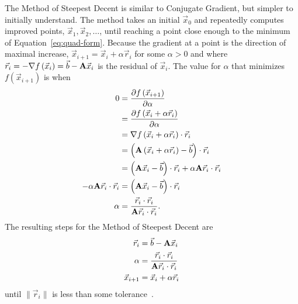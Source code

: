The Method of Steepest Decent is similar to Conjugate Gradient, but simpler to initially understand.
The method takes an initial \(\vec{x}_0\) and repeatedly computes improved points, \(\vec{x}_1, \vec{x}_2, \dots\), until reaching a point close enough to the minimum of Equation~\ref{eq:quad-form}.
Because the gradient at a point is the direction of maximal increase, \(\vec{x}_{i+1} = \vec{x}_i + \alpha \vec{r}_i\) for some \(\alpha > 0\) and where \(\vec{r}_i = -\nabla f\left(\vec{x}_i\right) = \vec{b} - \mathbf{A}\vec{x}_i\) is the residual of \(\vec{x}_i\).
The value for \(\alpha\) that minimizes \(f\left(\vec{x}_{i+1}\right)\) is when 
\begin{align*}
	0
	&= \frac{\partial f\left(\vec{x}_{i+1}\right)}{\partial \alpha} \\
	&= \frac{\partial f\left(\vec{x}_i + \alpha \vec{r}_i\right)}{\partial \alpha} \\
	&= \nabla f\left(\vec{x}_i+\alpha\vec{r}_i\right) \cdot \vec{r}_i \\
	&= \left(\mat{A}\left(\vec{x}_i+\alpha\vec{r}_i\right)-\vec{b}\right)\cdot \vec{r}_i \\
	&= \left(\mat{A}\vec{x}_i-\vec{b}\right)\cdot \vec{r}_i + \alpha\mat{A}\vec{r}_i\cdot \vec{r}_i\\
%
	-\alpha\mat{A}\vec{r}_i\cdot \vec{r}_i
	&= \left(\mat{A}\vec{x}_i-\vec{b}\right)\cdot \vec{r}_i \\
%
	\alpha
	&= \frac{\vec{r}_i\cdot \vec{r}_i}{\mat{A}\vec{r}_i\cdot\vec{r}_i}.
\end{align*}
The resulting steps for the Method of Steepest Decent are
\begin{align*}
	\vec{r}_i &= \vec{b} - \mathbf{A}\vec{x}_i \\
	\alpha &= \frac{\vec{r}_i\cdot \vec{r}_i}{\mathbf{A}\vec{r}_i\cdot\vec{r}_i}\\
	\vec{x}_{i+1} &= \vec{x}_i + \alpha\vec{r}_i
\end{align*}
until \(\|\vec{r}_i\|\) is less than some tolerance~\cite{Shewchuk:1994:IntroToCG}.


\begin{example}
\end{example}